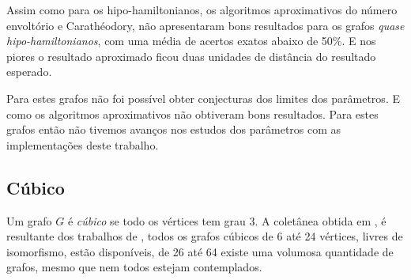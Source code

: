 \begin{multicols}{2}
\columnbreak
{}
\end{multicols}

Assim como para os hipo-hamiltonianos, 
os algoritmos aproximativos do número envoltório e Carathéodory,
não apresentaram bons resultados para os grafos \textit{quase hipo-hamiltonianos},
com uma média de acertos exatos abaixo de 50\%.
E nos piores o resultado aproximado ficou duas unidades de distância do resultado esperado.

Para estes grafos não foi possível obter conjecturas dos limites dos parâmetros.
E como os algoritmos aproximativos não obtiveram bons resultados. 
Para estes grafos então não tivemos avanços nos estudos dos parâmetros 
com as implementações deste trabalho.



\subsection{Cúbico}

Um grafo $G$ é \textit{cúbico} se todo os vértices tem grau 3.
A coletânea obtida em \cite{hog2013},
é resultante dos trabalhos de \cite{Brinkmann2011,Brinkmann1995,Robinson1983},
todos os grafos cúbicos de 6 até 24 vértices, livres de isomorfismo, estão disponíveis,
de 26 até 64 existe uma volumosa quantidade de grafos,
mesmo que nem todos estejam contemplados.

